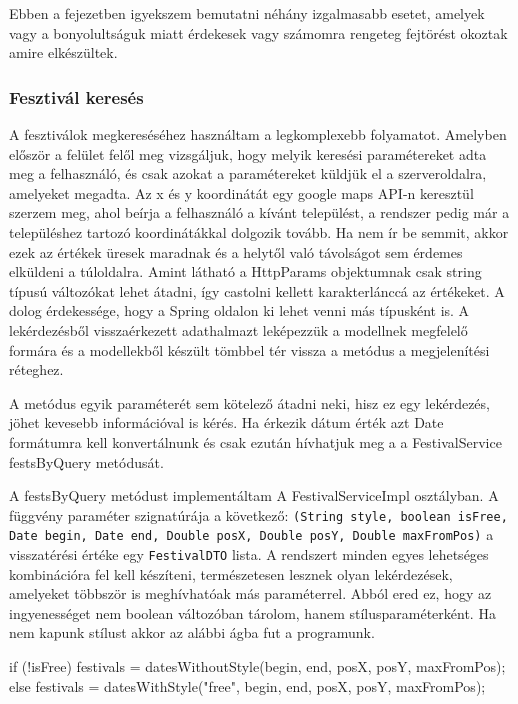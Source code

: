 
Ebben a fejezetben igyekszem bemutatni néhány izgalmasabb esetet, amelyek vagy a bonyolultságuk miatt érdekesek vagy számomra rengeteg fejtörést okoztak amire elkészültek.

\subsubsection{Fesztivál keresés}
A fesztiválok megkereséséhez használtam a legkomplexebb folyamatot. Amelyben először a felület felől meg vizsgáljuk, hogy melyik keresési paramétereket adta meg a felhasználó, és csak azokat a paramétereket küldjük el a szerveroldalra, amelyeket megadta. Az x és y koordinátát egy google maps API-n keresztül szerzem meg, ahol beírja a felhasználó a kívánt települést, a rendszer pedig már a településhez tartozó koordinátákkal dolgozik tovább. Ha nem ír be semmit, akkor ezek az értékek üresek maradnak és a helytől való távolságot sem érdemes elküldeni a túloldalra. Amint látható a HttpParams objektumnak csak string típusú változókat lehet átadni, így castolni kellett karakterlánccá az értékeket. A dolog érdekessége, hogy a Spring oldalon ki lehet venni más típusként is.
A lekérdezésből visszaérkezett adathalmazt leképezzük a modellnek megfelelő formára és a modellekből készült tömbbel tér vissza a metódus a megjelenítési réteghez.

A metódus egyik paraméterét sem kötelező átadni neki, hisz ez egy lekérdezés, jöhet kevesebb információval is kérés. Ha érkezik dátum érték azt Date formátumra kell konvertálnunk és csak ezután hívhatjuk meg a a FestivalService festsByQuery metódusát.

A festsByQuery metódust implementáltam A FestivalServiceImpl osztályban. A függvény paraméter szignatúrája a következő: \texttt{(String style, boolean isFree, Date begin, Date end, Double posX, Double posY, Double maxFromPos)} a visszatérési értéke egy \texttt{FestivalDTO} lista. A rendszert minden egyes lehetséges kombinációra fel kell készíteni, természetesen lesznek olyan lekérdezések, amelyeket többször is meghívhatóak más paraméterrel. Abból ered ez, hogy az ingyenességet nem boolean változóban tárolom, hanem stílusparaméterként.
Ha nem kapunk stílust akkor az alábbi ágba fut a programunk.
\begin{java}
if (!isFree) {
festivals = datesWithoutStyle(begin, end, posX, posY, 
maxFromPos);
} else {
    festivals = datesWithStyle("free", begin, end, posX, posY,
    maxFromPos);
}
\end{java}

